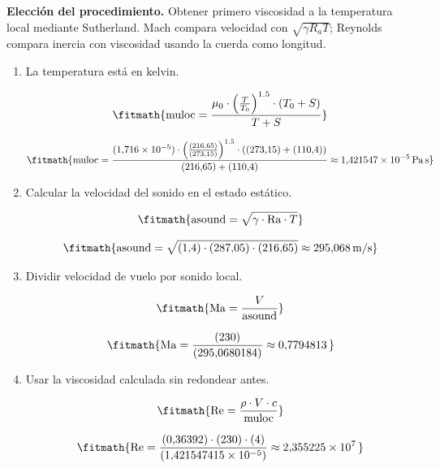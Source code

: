 \noindent\textbf{Elección del procedimiento.} Obtener primero viscosidad a la temperatura local mediante Sutherland. Mach compara velocidad con $\sqrt{\gamma R_aT}$; Reynolds compara inercia con viscosidad usando la cuerda como longitud.

\begin{enumerate}

\item La temperatura está en kelvin.

\[\fitmath{\mathrm{muloc}=\frac{\mu_{0}\cdot {\left(\frac{T}{T_{0}}\right)}^{1.5}\cdot \left(T_{0}+S\right)}{T+S}}\]

\[\fitmath{\mathrm{muloc}=\frac{(1{,}716\times10^{-5})\cdot {\left(\frac{(216{,}65)}{(273{,}15)}\right)}^{1.5}\cdot \left((273{,}15)+(110{,}4)\right)}{(216{,}65)+(110{,}4)}\approx 1{,}421547\times10^{-5}\,\mathrm{Pa\,s}}\]

\item Calcular la velocidad del sonido en el estado estático.

\[\fitmath{\mathrm{asound}=\sqrt{\gamma\cdot \mathrm{Ra}\cdot T}}\]

\[\fitmath{\mathrm{asound}=\sqrt{(1{,}4)\cdot (287{,}05)\cdot (216{,}65)}\approx 295{,}068\,\mathrm{m/s}}\]

\item Dividir velocidad de vuelo por sonido local.

\[\fitmath{\mathrm{Ma}=\frac{V}{\mathrm{asound}}}\]

\[\fitmath{\mathrm{Ma}=\frac{(230)}{(295{,}0680184)}\approx 0{,}7794813\,}\]

\item Usar la viscosidad calculada sin redondear antes.

\[\fitmath{\mathrm{Re}=\frac{\rho\cdot V\cdot c}{\mathrm{muloc}}}\]

\[\fitmath{\mathrm{Re}=\frac{(0{,}36392)\cdot (230)\cdot (4)}{(1{,}421547415\times10^{-5})}\approx 2{,}355225\times10^{7}\,}\]

\end{enumerate}
